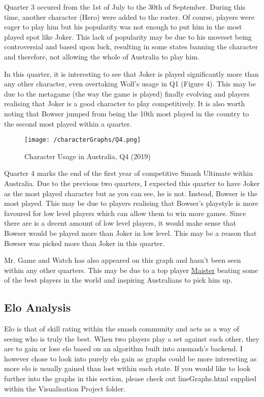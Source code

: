 \documentclass[11pt, oneside, a4paper]{article}
\begin{document}
Quarter 3 occured from the 1st of July to the 30th of September. During this time, another character (Hero) were added to the roster. Of course, players were eager to play him but his popularity was not enough to put him in the most played spot like Joker. This lack of popularity may be due to his moveset being controversial and based upon luck, resulting in some states banning the character and therefore, not allowing the whole of Australia to play him.

In this quarter, it is interesting to see that Joker is played significantly more than any other character, even overtaking Wolf's usage in Q1 (Figure 4). This may be due to the metagame (the way the game is played) finally evolving and players realising that Joker is a good character to play competitively. It is also worth noting that Bowser jumped from being the 10th most played in the country to the second most played within a quarter. 

\newpage
\begin{figure}[!ht]
	\centerline{\texttt{[image: /characterGraphs/Q4.png]}}
	\caption{Character Usage in Australia, Q4 (2019)}
	\label{fig:figure2}
\end{figure}

Quarter 4 marks the end of the first year of competitive Smash Ultimate within Australia. Due to the previous two quarters, I expected this quarter to have Joker as the most played character but as you can see, he is not. Instead, Bowser is the most played. This may be due to players realising that Bowser's playstyle is more favoured for low level players which can allow them to win more games. Since there are is a decent amount of low level players, it would make sense that Bowser would be played more than Joker in low level. This may be a reason that Bowser was picked more than Joker in this quarter.

Mr. Game and Watch has also appeared on this graph and hasn't been seen within any other quarters. This may be due to a top player \href{https://liquipedia.net/smash/Maister}{Maister} beating some of the best players in the world and inspiring Australians to pick him up.

\newpage
\subsection{Elo Analysis}
Elo is that of skill rating within the smash community and acts as a way of seeing who is truly the best. When two players play a set against each other, they are to gain or lose elo based on an algorithm built into ausmash's backend. I however chose to look into purely elo gain as graphs could be more interesting as more elo is usually gained than lost within each state. If you would like to look further into the graphs in this section, please check out lineGraphs.html supplied within the Visualisation Project folder.
\end{document}
